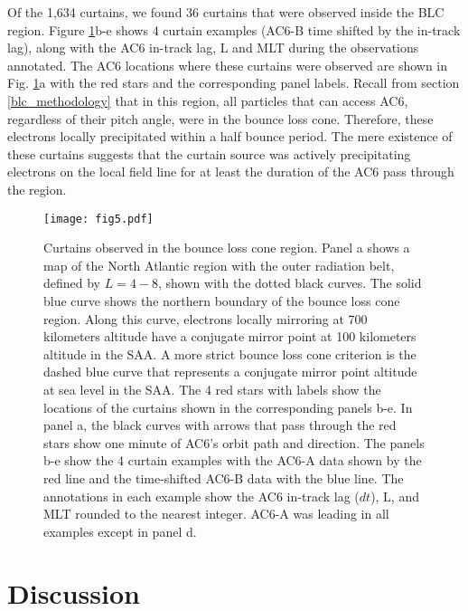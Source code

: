\documentclass[draft]{agujournal2019}
\begin{document}
Of the 1,634 curtains, we found 36 curtains that were observed inside the BLC region. Figure \ref{fig3}b-e shows 4 curtain examples (AC6-B time shifted by the in-track lag), along with the AC6 in-track lag, L and MLT during the observations annotated. The AC6 locations where these curtains were observed are shown in Fig. \ref{fig3}a with the red stars and the corresponding panel labels. Recall from section \ref{blc_methodology} that in this region, all particles that can access AC6, regardless of their pitch angle, were in the bounce loss cone. Therefore, these electrons locally precipitated within a half bounce period. The mere existence of these curtains suggests that the curtain source was actively precipitating electrons on the local field line for at least the duration of the AC6 pass through the region.

\begin{figure}
\texttt{[image: fig5.pdf]}
\caption{Curtains observed in the bounce loss cone region. Panel a shows a map of the North Atlantic region with the outer radiation belt, defined by $L=4-8$, shown with the dotted black curves. The solid blue curve shows the northern boundary of the bounce loss cone region. Along this curve, electrons locally mirroring at 700 kilometers altitude have a conjugate mirror point at 100 kilometers altitude in the SAA. A more strict bounce loss cone criterion is the dashed blue curve that represents a conjugate mirror point altitude at sea level in the SAA. The 4 red stars with labels show the locations of the curtains shown in the corresponding panels b-e. In panel a, the black curves with arrows that pass through the red stars show one minute of AC6's orbit path and direction. The panels b-e show the 4 curtain examples with the AC6-A data shown by the red line and the time-shifted AC6-B data with the blue line. The annotations in each example show the AC6 in-track lag ($dt$), L, and MLT rounded to the nearest integer. AC6-A was leading in all examples except in panel d.}
\label{fig3}
\end{figure}

\section{Discussion} \label{discussion}
\end{document}

